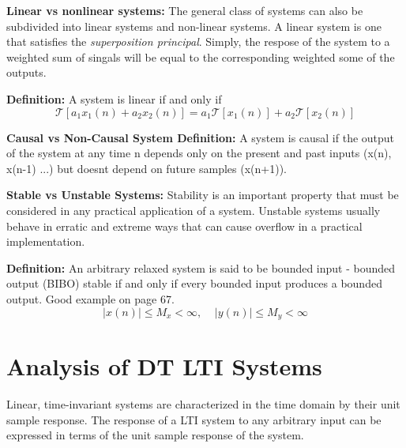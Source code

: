 \documentclass{article} %
\begin{document}
	\textbf{Linear vs nonlinear systems:} The general class of systems can also be subdivided into linear systems and non-linear systems. A linear system is one that satisfies the \textit{superposition principal}. Simply, the respose of the system to a weighted sum of singals will be equal to the corresponding weighted some of the outputs.
	
	\textbf{Definition:} A system is linear if and only if 
	\begin{equation}
 	\mathcal{T}[a_1x_1(n) + a_2x_2(n)] = a_1\mathcal{T}[x_1(n)] + a_2\mathcal{T}[x_2(n)]
	\end{equation}
	
	\textbf{Causal vs Non-Causal System Definition:} A system is causal if the  output of the system at any time n depends only on the present and past inputs (x(n), x(n-1) ...) but doesnt depend on future samples (x(n+1)). 
	
	\textbf{Stable vs Unstable Systems:} Stability is an important property that must be considered in any practical application of a system. Unstable systems usually behave in erratic and extreme ways that can cause overflow in a practical implementation.
	
	\textbf{Definition:} An arbitrary relaxed system is said to be bounded input - bounded output (BIBO) stable if and only if every bounded input produces a bounded output. Good example on page 67.
	\begin{equation}
 	|x(n)| \le M_x < \infty, \;\;\;\; |y(n)| \le M_y < \infty
	\end{equation}
	
	\section{Analysis of DT LTI Systems}
	Linear, time-invariant systems are characterized in the time domain by their unit sample response. The response of a LTI system to any arbitrary input can be expressed  in terms of the unit sample response of the system.
\end{document}
